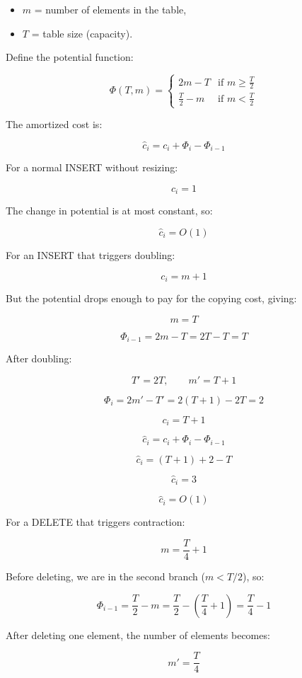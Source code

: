 \documentclass[12pt]{article}
\begin{document}
\begin{itemize}
    \item $m$ = number of elements in the table,
    \item $T$ = table size (capacity).
\end{itemize}

Define the potential function:

\[
\Phi(T,m) =
\begin{cases}
2m - T & \text{if } m \geq \frac{T}{2} \\[6pt]
\frac{T}{2} - m & \text{if } m < \frac{T}{2}
\end{cases}
\]

The amortized cost is:

\[
\hat{c}_i = c_i + \Phi_i - \Phi_{i-1}
\]

For a normal INSERT without resizing:

\[
c_i = 1
\]

The change in potential is at most constant, so:

\[
\hat{c}_i = O(1)
\]

For an INSERT that triggers doubling:

\[
c_i = m + 1
\]

But the potential drops enough to pay for the copying cost, giving:

\[
m = T
\]

\[
\Phi_{i-1} = 2m - T = 2T - T = T
\]

After doubling:

\[
T' = 2T,\qquad m' = T + 1
\]

\[
\Phi_i = 2m' - T' = 2(T+1) - 2T = 2
\]

\[
c_i = T + 1
\]

\[
\hat{c}_i = c_i + \Phi_i - \Phi_{i-1}
\]

\[
\hat{c}_i = (T+1) + 2 - T
\]

\[
\hat{c}_i = 3
\]

\[
\hat{c}_i = O(1)
\]

For a DELETE that triggers contraction:

\[
m = \frac{T}{4} + 1
\]

Before deleting, we are in the second branch ($m < T/2$), so:

\[
\Phi_{i-1} = \frac{T}{2} - m
=
\frac{T}{2} - \left(\frac{T}{4}+1\right)
=
\frac{T}{4}-1
\]

After deleting one element, the number of elements becomes:

\[
m' = \frac{T}{4}
\]
\end{document}
